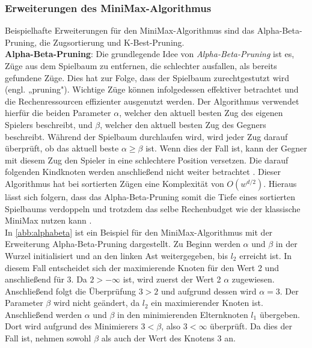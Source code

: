 \documentclass[12pt,a4paper,bibliography=totocnumbered,listof=totocnumbered]{article}
\begin{document}
\subsubsection{Erweiterungen des MiniMax-Algorithmus}
Beispielhafte Erweiterungen für den MiniMax-Algorithmus sind das Alpha-Beta-Pruning, die Zugsortierung und K-Best-Pruning.\\
\textbf{Alpha-Beta-Pruning}: Die grundlegende Idee von \emph{Alpha-Beta-Pruning} ist es, Züge aus dem Spielbaum zu entfernen, die schlechter ausfallen, als bereits gefundene Züge. Dies hat zur Folge, dass der Spielbaum zurechtgestutzt wird (engl. „pruning"). Wichtige Züge können infolgedessen effektiver betrachtet und die Rechenressourcen effizienter ausgenutzt werden. Der Algorithmus verwendet hierfür die beiden Parameter $\alpha$, welcher den aktuell besten Zug des eigenen Spielers beschreibt, und $\beta$, welcher den aktuell besten Zug des Gegners beschreibt. Während der Spielbaum durchlaufen wird, wird jeder Zug darauf überprüft, ob das aktuell beste $\alpha \geq \beta$ ist. Wenn dies der Fall ist, kann der Gegner mit diesem Zug den Spieler in eine schlechtere Position versetzen. Die darauf folgenden Kindknoten werden anschließend nicht weiter betrachtet \citep[S.101ff.]{Jones.2008}. Dieser Algorithmus hat bei sortierten Zügen eine Komplexität von $O(w^{d/2})$. Hieraus lässt sich folgern, dass das Alpha-Beta-Pruning somit die Tiefe eines sortierten Spielbaums verdoppeln und trotzdem das selbe Rechenbudget wie der klassische MiniMax nutzen kann \cite[Kapitel 6]{CarstenKern.2021}.\\
In \autoref{abb:alphabeta} ist ein Beispiel für den MiniMax-Algorithmus mit der Erweiterung Alpha-Beta-Pruning dargestellt. Zu Beginn werden $\alpha$ und $\beta$ in der Wurzel initialisiert und an den linken Ast weitergegeben, bis $l_2$ erreicht ist. In diesem Fall entscheidet sich der maximierende Knoten für den Wert 2 und anschließend für 3. Da $2>-\infty$ ist, wird zuerst der Wert 2 $\alpha$ zugewiesen. Anschließend folgt die Überprüfung $3>2$ und aufgrund dessen wird $\alpha=3$. Der Parameter $\beta$ wird nicht geändert, da $l_2$ ein maximierender Knoten ist. Anschließend werden $\alpha$ und $\beta$ in den minimierenden Elternknoten $l_1$ übergeben. Dort wird aufgrund des Minimierers $3<\beta$, also $3<\infty$ überprüft. Da dies der Fall ist, nehmen sowohl $\beta$ als auch der Wert des Knotens 3 an.
\end{document}
